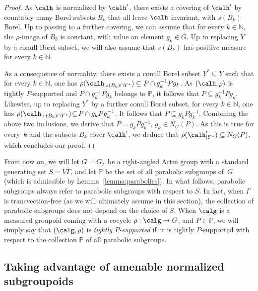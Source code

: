 \begin{proof}
As $\calh$ is normalized by $\calh'$, there exists a covering of $\calh'$ by countably many Borel subsets $B_k$ that all leave $\calh$ invariant, with $s(B_k)$ Borel. Up to passing to a further covering, we can assume that for every $k\in\mathbb{N}$, the $\rho$-image of $B_k$ is constant, with value an element $g_k\in G$. Up to replacing $Y$ by a conull Borel subset, we will also assume that $s(B_k)$ has positive measure for every $k\in\mathbb{N}$.

As a consequence of normality, there exists a conull Borel subset $Y^*\subseteq Y$ such that for every $k\in\mathbb{N}$, one has $\rho(\calh_{|s(B_k)\cap Y^*})\subseteq P\cap g_k^{-1}Pg_k$. As $(\calh,\rho)$ is tightly $P$\nobreakdash-sup\-ported and $P\cap g_k^{-1}Pg_k$ belongs to $\mathbb{P}$, it follows that $P\subseteq g_k^{-1}Pg_k$. Likewise, up to replacing $Y^*$ by a further conull Borel subset, for every $k\in\mathbb{N}$, one has $\rho(\calh_{|r(B_k)\cap Y^*})\!\subseteq\! P\cap g_kPg_k^{-1}$. It follows that $P\!\subseteq\! g_kPg_k^{-1}$. Combining the above two inclusions, we derive that $P\!=\!g_kPg_k^{-1}$, \ie $g_k\!\in\! N_G(P)$. As this is true for every~$k$ and the subsets $B_k$ cover $\calh'$, we deduce that $\rho(\calh'_{|Y^{\ast}}) \subseteq N_G(P)$, which concludes our proof.
\end{proof}

\begin{rk}\label{rk:support-raag}
From now on, we will let $G=G_\Gamma$ be a right-angled Artin group with a standard generating set $S=V\Gamma$, and let $\mathbb{P}$ be the set of all parabolic subgroups of~$G$ (which is admissible by Lemma~\ref{lemma:parabolics}). In what follows, parabolic subgroups always refer to parabolic subgroups with respect to $S$. In fact, when $\Gamma$ is transvection-free (as we will ultimately assume in this section), the collection of parabolic subgroups does not depend on the choice of $S$. When $\calg$ is a measured groupoid coming with a cocycle $\rho:\calg\to G$, and $P\in\mathbb{P}$, we will simply say that $(\calg,\rho)$ is \emph{tightly $P$-supported} if~it is tightly $P$-supported with respect to the collection $\mathbb{P}$ of all parabolic subgroups.
\end{rk}

\subsection{Taking advantage of amenable normalized subgroupoids}

